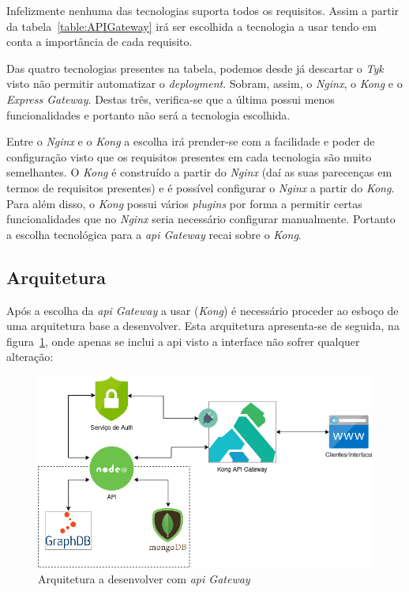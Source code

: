 Infelizmente nenhuma das tecnologias suporta todos os requisitos. 
Assim a partir da tabela~\ref{table:APIGateway} irá ser escolhida a tecnologia a usar tendo em conta a importância 
de cada requisito.

Das quatro tecnologias presentes na tabela, podemos desde já descartar o \textit{Tyk} visto não permitir 
automatizar o \textit{deployment}. Sobram, assim, o \textit{Nginx}, o \textit{Kong} e o \textit{Express Gateway}. 
Destas três, verifica-se que a última possui menos funcionalidades e portanto não será a tecnologia escolhida.

Entre o \textit{Nginx} e o \textit{Kong} a escolha irá prender-se com a facilidade e poder de configuração visto 
que os requisitos presentes em cada tecnologia são muito semelhantes. O \textit{Kong} é construído a partir do 
\textit{Nginx} (daí as suas parecenças em termos de requisitos presentes) e é possível configurar o 
\textit{Nginx} a partir do \textit{Kong}. Para além disso, o \textit{Kong} possui vários \textit{plugins} por 
forma a permitir certas funcionalidades que no \textit{Nginx} seria necessário configurar manualmente. Portanto a escolha tecnológica para a \textit{\acrshort{api} Gateway} recai 
sobre o \textit{Kong}.

\subsection{Arquitetura}

Após a escolha da \textit{\acrshort{api} Gateway} a usar (\textit{Kong}) é necessário proceder ao esboço de 
uma arquitetura base a desenvolver. Esta arquitetura apresenta-se de seguida, na figura~\ref{fig:apiGatewayArch}, onde apenas se inclui a 
\acrshort{api} visto a interface não sofrer qualquer alteração:
\begin{figure}[H]
    \centering
    \includegraphics[width=1\textwidth]{img/apiGatewayArch.png}
    \caption{Arquitetura a desenvolver com \textit{\acrshort{api} Gateway}}\label{fig:apiGatewayArch}
\end{figure}

